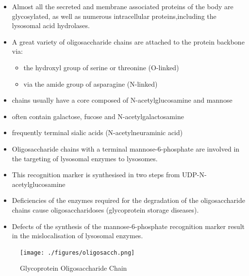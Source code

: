 \documentclass{scrartcl}
\begin{document}
\begin{itemize}
\item Almost all the secreted and membrane associated proteins of the body
are glycosylated, as well as numerous intracellular
proteins,including the lysosomal acid hydrolases.
\item A great variety of oligosaccharide chains are attached to the
protein backbone via:
\begin{itemize}
\item the hydroxyl group of serine or threonine (O-linked)
\item via the amide group of asparagine (N-linked)
\end{itemize}

\item chains usually have a core composed of N-acetylglucosamine and mannose
\item often contain galactose, fucose and N-acetylgalactosamine
\item frequently terminal sialic acids (N-acetylneuraminic acid)
\item Oligosaccharide chains with a terminal mannose-6-phosphate are
involved in the targeting of lysosomal enzymes to lysosomes.
\item This recognition marker is synthesised in two steps from UDP-N-acetylglucosamine

\item Deficiencies of the enzymes required for the degradation of the
oligosaccharide chains cause oligosaccharidoses (glycoprotein storage diseases).

\item Defects of the synthesis of the mannose-6-phosphate recognition
marker result in the mislocalisation of lysosomal enzymes.
\end{itemize}


\begin{figure}[htbp]
\centering
\texttt{[image: ./figures/oligosacch.png]}
\caption{\label{fig:org7bc5c21}
Glycoprotein Oligosaccharide Chain}
\end{figure}
\end{document}

